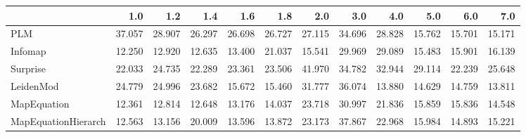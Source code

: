 \begin{tabular}{lrrrrrrrrrrr}
\toprule
{} &    1.0 &    1.2 &    1.4 &    1.6 &    1.8 &    2.0 &    3.0 &    4.0 &    5.0 &    6.0 &    7.0 \\
\midrule
PLM                 & 37.057 & 28.907 & 26.297 & 26.698 & 26.727 & 27.115 & 34.696 & 28.828 & 15.762 & 15.701 & 15.171 \\
Infomap             & 12.250 & 12.920 & 12.635 & 13.400 & 21.037 & 15.541 & 29.969 & 29.089 & 15.483 & 15.901 & 16.139 \\
Surprise            & 22.033 & 24.735 & 22.289 & 23.361 & 23.506 & 41.970 & 34.782 & 32.944 & 29.114 & 22.239 & 25.648 \\
LeidenMod           & 24.779 & 24.996 & 23.682 & 15.672 & 15.460 & 31.777 & 36.074 & 13.880 & 14.629 & 14.759 & 13.811 \\
MapEquation         & 12.361 & 12.814 & 12.648 & 13.176 & 14.037 & 23.718 & 30.997 & 21.836 & 15.859 & 15.836 & 14.548 \\
MapEquationHierarch & 12.563 & 13.156 & 20.009 & 13.596 & 13.872 & 23.173 & 37.867 & 22.968 & 15.984 & 14.893 & 15.221 \\
\bottomrule
\end{tabular}
